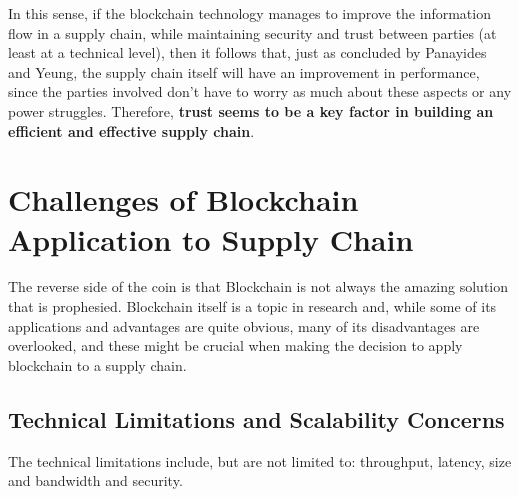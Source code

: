 
In this sense, if the blockchain technology manages to improve the information flow in a supply chain, while maintaining security and trust between parties (at least at a technical level), then it follows that, just as concluded by Panayides and Yeung, the supply chain itself will have an improvement in performance, since the parties involved don't have to worry as much about these aspects or any power struggles. Therefore, \textbf{trust seems to be a key factor in building an efficient and effective supply chain}.

\section{Challenges of Blockchain Application to Supply Chain}

The reverse side of the coin is that Blockchain is not always the amazing solution that is prophesied. Blockchain itself is a topic in research and, while some of its applications and advantages are quite obvious, many of its disadvantages are overlooked, and these might be crucial when making the decision to apply blockchain to a supply chain.
\subsection{Technical Limitations and Scalability Concerns}
The technical limitations include, but are not limited to: throughput, latency, size and bandwidth and security.

